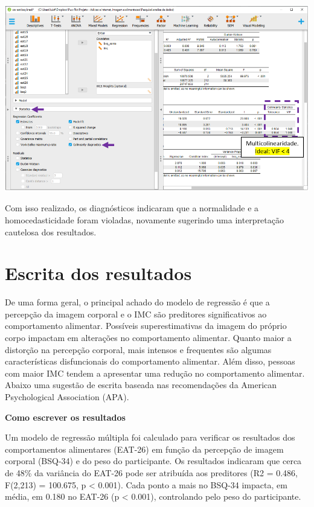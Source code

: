 \documentclass[
]{book}
\begin{document}
\includegraphics{./img/cap_reg_multipla_colinearidade2_jasp.png}

Com isso realizado, os diagnósticos indicaram que a normalidade e a
homocedasticidade foram violadas, novamente sugerindo uma interpretação
cautelosa dos resultados.

\hypertarget{escrita-dos-resultados-13}{%
\section{Escrita dos resultados}\label{escrita-dos-resultados-13}}

De uma forma geral, o principal achado do modelo de regressão é que a
percepção da imagem corporal e o IMC são preditores significativos ao
comportamento alimentar. Possíveis superestimativas da imagem do próprio
corpo impactam em alterações no comportamento alimentar. Quanto maior a
distorção na percepção corporal, mais intensos e frequentes são algumas
características disfuncionais do comportamento alimentar. Além disso,
pessoas com maior IMC tendem a apresentar uma redução no comportamento
alimentar. Abaixo uma sugestão de escrita baseada nas recomendações da
American Psychological Association (APA).

\begin{writing}
\textbf{Como escrever os resultados}

Um modelo de regressão múltipla foi calculado para verificar os
resultados dos comportamentos alimentares (EAT-26) em função da
percepção de imagem corporal (BSQ-34) e do peso do participante. Os
resultados indicaram que cerca de 48\% da variância do EAT-26 pode ser
atribuída aos preditores (R2 = 0.486, F(2,213) = 100.675, p \textless{}
0.001). Cada ponto a mais no BSQ-34 impacta, em média, em 0.180 no
EAT-26 (p \textless{} 0.001), controlando pelo peso do participante.
\end{writing}
\end{document}
